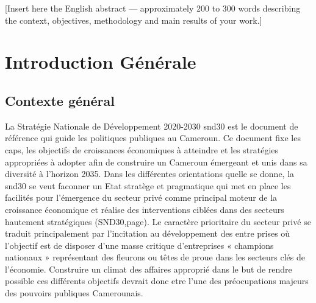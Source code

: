\documentclass[12pt, a4paper, oneside]{report}
\begin{document}
\medskip

[Insert here the English abstract — approximately 200 to 300 words describing the context, objectives, methodology and main results of your work.]

\tableofcontents
{}

\listoffigures
{}

\listoftables
{}

\printglossary[type=\acronymtype, title=Liste des acronymes et abréviations]

\setcounter{page}{1}

\chapter*{Introduction Générale}

\section*{Contexte général}

La Stratégie Nationale de Développement 2020-2030 \gls{snd30} est le document de référence qui guide les politiques publiques au Cameroun. Ce document fixe les caps, les objectifs de croissances économiques à atteindre et les stratégies appropriées à adopter afin de construire un Cameroun émergeant et unis dans sa diversité à l'horizon 2035. Dans les différentes orientations quelle se donne, la \gls{snd30} se veut faconner un Etat stratège et pragmatique qui met en place les facilités pour l’émergence du secteur privé comme
principal moteur de la croissance économique et réalise des interventions ciblées dans des secteurs hautement stratégiques (SND30,page). Le caractère prioritaire du secteur privé se traduit principalement par l’incitation au développement des entre
prises où l’objectif est de disposer d’une masse critique d’entreprises « champions nationaux » représentant des fleurons ou têtes de proue dans les secteurs clés de l’économie. Construire un climat des affaires approprié dans le but de rendre possible ces différents objectifs devrait donc etre l'une des préocupations majeurs des pouvoirs publiques Camerounais. 
\end{document}
